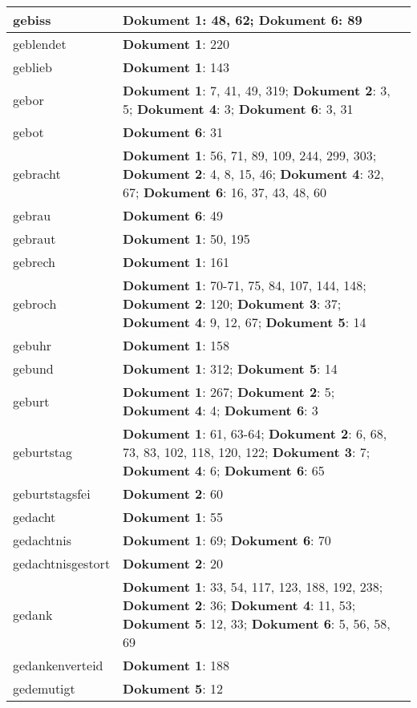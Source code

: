 \documentclass[a5paper]{article}
\begin{document}
\begin{longtable}[l]{|l|p{3in}|}
\hline
gebiss & \textbf{Dokument 1}: 48, 62; \textbf{Dokument 6}: 89 \\
\hline
geblendet & \textbf{Dokument 1}: 220 \\
\hline
geblieb & \textbf{Dokument 1}: 143 \\
\hline
gebor & \textbf{Dokument 1}: 7, 41, 49, 319; \textbf{Dokument 2}: 3, 5; \textbf{Dokument 4}: 3; \textbf{Dokument 6}: 3, 31 \\
\hline
gebot & \textbf{Dokument 6}: 31 \\
\hline
gebracht & \textbf{Dokument 1}: 56, 71, 89, 109, 244, 299, 303; \textbf{Dokument 2}: 4, 8, 15, 46; \textbf{Dokument 4}: 32, 67; \textbf{Dokument 6}: 16, 37, 43, 48, 60 \\
\hline
gebrau & \textbf{Dokument 6}: 49 \\
\hline
gebraut & \textbf{Dokument 1}: 50, 195 \\
\hline
gebrech & \textbf{Dokument 1}: 161 \\
\hline
gebroch & \textbf{Dokument 1}: 70-71, 75, 84, 107, 144, 148; \textbf{Dokument 2}: 120; \textbf{Dokument 3}: 37; \textbf{Dokument 4}: 9, 12, 67; \textbf{Dokument 5}: 14 \\
\hline
gebuhr & \textbf{Dokument 1}: 158 \\
\hline
gebund & \textbf{Dokument 1}: 312; \textbf{Dokument 5}: 14 \\
\hline
geburt & \textbf{Dokument 1}: 267; \textbf{Dokument 2}: 5; \textbf{Dokument 4}: 4; \textbf{Dokument 6}: 3 \\
\hline
geburtstag & \textbf{Dokument 1}: 61, 63-64; \textbf{Dokument 2}: 6, 68, 73, 83, 102, 118, 120, 122; \textbf{Dokument 3}: 7; \textbf{Dokument 4}: 6; \textbf{Dokument 6}: 65 \\
\hline
geburtstagsfei & \textbf{Dokument 2}: 60 \\
\hline
gedacht & \textbf{Dokument 1}: 55 \\
\hline
gedachtnis & \textbf{Dokument 1}: 69; \textbf{Dokument 6}: 70 \\
\hline
gedachtnisgestort & \textbf{Dokument 2}: 20 \\
\hline
gedank & \textbf{Dokument 1}: 33, 54, 117, 123, 188, 192, 238; \textbf{Dokument 2}: 36; \textbf{Dokument 4}: 11, 53; \textbf{Dokument 5}: 12, 33; \textbf{Dokument 6}: 5, 56, 58, 69 \\
\hline
gedankenverteid & \textbf{Dokument 1}: 188 \\
\hline
gedemutigt & \textbf{Dokument 5}: 12 \\
\hline

\end{longtable}
\end{document}
